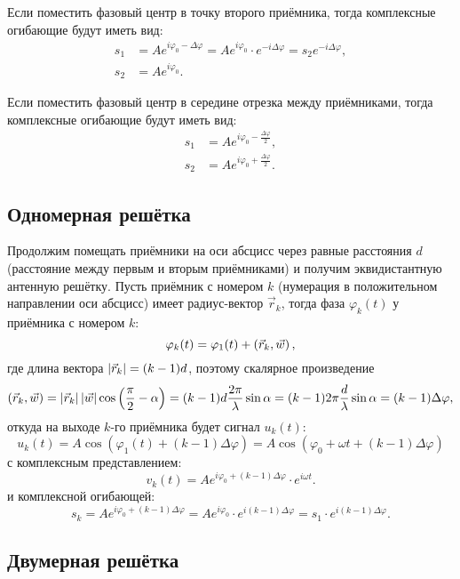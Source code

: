 Если поместить фазовый центр в точку второго приёмника, тогда комплексные огибающие будут иметь вид:
\begin{align*}
    s_1 & = A e^{i \varphi_0 - \Delta \varphi} = A e^{i \varphi_0} \cdot e^{-i \Delta \varphi} = s_2 e^{-i \Delta \varphi}, \\
    s_2 & = A e^{i \varphi_0}.
\end{align*}

Если поместить фазовый центр в середине отрезка между приёмниками, тогда комплексные огибающие будут иметь вид:
\begin{align*}
    s_1 & = A e^{i \varphi_0 - \frac{\Delta \varphi}{2}}, \\
    s_2 & = A e^{i \varphi_0 + \frac{\Delta \varphi}{2}}.
\end{align*}

\subsection{Одномерная решётка}

Продолжим помещать приёмники на оси абсцисс через равные расстояния $d$ (расстояние между первым и вторым приёмниками) и получим эквидистантную антенную решётку.
Пусть приёмник с номером $k$ (нумерация в положительном направлении оси абсцисс) имеет радиус-вектор $\vec{r}_k$, тогда фаза $\varphi_k(t)$ у приёмника
с номером $k$:
\[
    \varphi_k(t) = \varphi_1(t) + \left ( \vec{r}_k, \vec{w} \right ),
\]
где длина вектора $\left | \vec{r}_k \right | = (k-1) d$, поэтому скалярное произведение
\[
    \left ( \vec{r}_k, \vec{w} \right )
    = \left | \vec{r}_k \right | \left | \vec{w} \right | \cos \left ( \frac{\pi}{2} - \alpha \right )
    = (k-1) d \frac{2 \pi}{\lambda} \sin \alpha
    = (k-1) 2 \pi \frac{d}{\lambda} \sin \alpha
    = (k-1) \Delta \varphi,
\]
откуда на выходе $k$-го приёмника будет сигнал $u_k(t)$:
\[
    u_k(t)
    = A \cos \left ( \varphi_1(t) + (k-1) \Delta \varphi \right )
    = A \cos \left ( \varphi_0 + \omega t + (k-1) \Delta \varphi \right )
\]
с комплексным представлением:
\[
    v_k(t)
    = A e^{i \varphi_0 + (k-1) \Delta \varphi } \cdot e^{i \omega t} .
\]
и комплексной огибающей:
\[
    s_k
    = A e^{i \varphi_0 + (k-1) \Delta \varphi }
    = A e^{i \varphi_0 } \cdot e^{i (k-1) \Delta \varphi}
    = s_1 \cdot e^{i (k-1) \Delta \varphi} .
\]

\subsection{Двумерная решётка}

